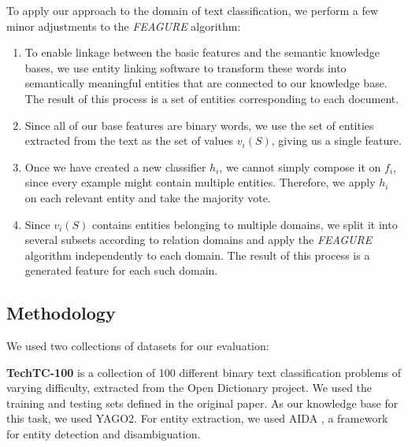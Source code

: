 \documentclass[twoside,11pt]{article}
\theoremstyle{definition}
\begin{document}
To apply our approach to the domain of text classification, we perform a few minor adjustments to the \emph{FEAGURE} algorithm:
\begin{enumerate}
	\item To enable linkage between the basic features and the semantic knowledge bases, we use entity linking software  to transform these words into semantically meaningful entities that are connected to our knowledge base. The result of this process is a set of entities corresponding to each document.
	\item Since all of our base features are binary words, we use the set of entities extracted from the text as the set of values $v_i(S)$, giving us a single feature.
	\item Once we have created a new classifier $h_i$, we cannot simply compose it on $f_i$, since every example might contain multiple entities. Therefore, we apply $h_i$ on each relevant entity and take the majority vote.
	\item Since $v_i(S)$ contains entities belonging to multiple domains,  we split it into several subsets according to relation domains and apply the \emph{FEAGURE} algorithm independently to each domain. The result of this process is a generated feature for each such domain.
\end{enumerate}

\subsection{Methodology}

We used two collections of datasets for our evaluation:

\textbf{TechTC-100} \cite{gabrilovich2004text} is a collection of 100 different binary text classification problems of varying difficulty, extracted from the Open Dictionary project.
We used the training and testing sets defined in the original paper. 
As our knowledge base for this task, we used YAGO2. %
For entity extraction, we used AIDA \cite{hoffart2011robust}, a framework for entity detection and disambiguation. 


\end{document}
